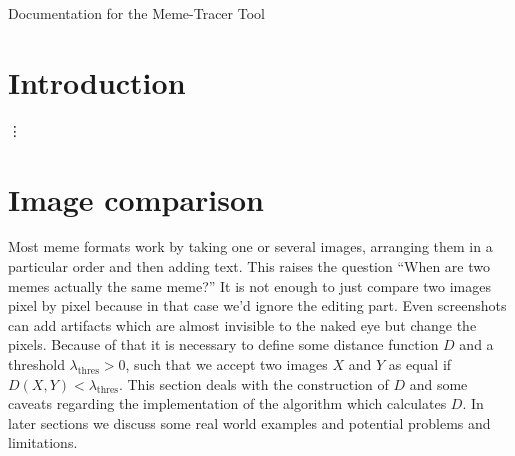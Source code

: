 \documentclass{article}
\begin{document}
\centerline{\sc \large Documentation for the Meme-Tracer Tool}
\vspace{.5pc}
\vspace{2pc}

\tableofcontents

\section{Introduction}
\begin{center}
\;\vdots
\end{center}

\section{Image comparison}
Most meme formats work by taking one or several images, arranging them in a particular order and then adding text. This raises the question ``When are two memes actually the same meme?'' It is not enough to just compare two images pixel by pixel because in that case we'd ignore the editing part. Even screenshots can add artifacts which are almost invisible to the naked eye but change the pixels. Because of that it is necessary to define some distance function $D$ and a threshold $\lambda_{\text{thres}} > 0$, such that we accept two images $X$ and $Y$ as equal if $D(X, Y) < \lambda_{\text{thres}}$. This section deals with the construction of $D$ and some caveats regarding the implementation of the algorithm which calculates $D$. In later sections we discuss some real world examples and potential problems and limitations.
\end{document}
